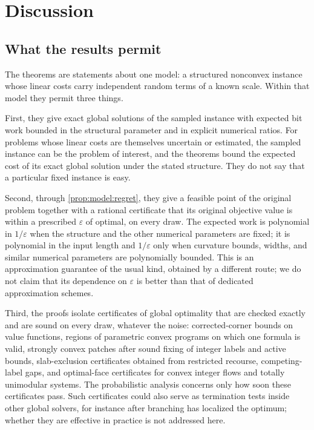 \section{Discussion}\label{sec:disc}

\subsection{What the results permit}\label{sec:disc:uses}

The theorems are statements about one model: a structured nonconvex instance
whose linear costs carry independent random terms of a known scale. Within
that model they permit three things.

First, they give exact global solutions of the sampled instance with expected
bit work bounded in the structural parameter and in explicit numerical
ratios. For problems whose linear costs are themselves uncertain or
estimated, the sampled instance can be the problem of interest, and the
theorems bound the expected cost of its exact global solution under the
stated structure. They do not say that a particular fixed instance is easy.

Second, through \cref{prop:model:regret}, they give a feasible point of the
original problem together with a rational certificate that its original
objective value is within a prescribed $\varepsilon$ of optimal, on every
draw. The expected work is polynomial in $1/\varepsilon$ when the structure
and the other numerical parameters are fixed; it is polynomial in the input
length and $1/\varepsilon$ only when curvature bounds, widths, and similar
numerical parameters are polynomially bounded. This is an approximation
guarantee of the usual kind, obtained by a different route; we do not claim
that its dependence on $\varepsilon$ is better than that of dedicated
approximation schemes.

Third, the proofs isolate certificates of global optimality that are checked
exactly and are sound on every draw, whatever the noise: corrected-corner
bounds on value functions, regions of parametric convex programs on which one
formula is valid, strongly convex patches after sound fixing of integer
labels and active bounds, slab-exclusion certificates obtained from restricted
recourse, competing-label gaps, and optimal-face certificates for convex
integer flows and totally unimodular systems. The probabilistic analysis
concerns only how soon these certificates pass. Such certificates could also
serve as termination tests inside other global solvers, for instance after
branching has localized the optimum; whether they are effective in practice
is not addressed here.

